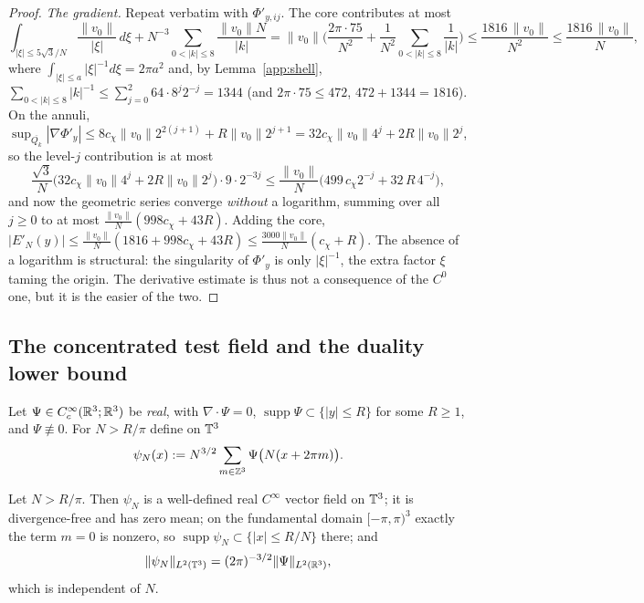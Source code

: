 \begin{proof}
\emph{The gradient.} Repeat verbatim with $\Phi'_{y,ij}$. The core
contributes at most
\[
\int_{|\xi|\le5\sqrt3/N}\frac{\|v_0\|}{|\xi|}\,d\xi
+N^{-3}\!\!\sum_{0<|k|\le8}\!\frac{\|v_0\|N}{|k|}
=\|v_0\|\Big(\frac{2\pi\cdot75}{N^{2}}
+\frac1{N^{2}}\!\!\sum_{0<|k|\le8}\!\frac1{|k|}\Big)
\le\frac{1816\,\|v_0\|}{N^{2}}\le\frac{1816\,\|v_0\|}{N},
\]
where $\int_{|\xi|\le a}|\xi|^{-1}d\xi=2\pi a^2$ and, by
Lemma~\ref{app:shell},
$\sum_{0<|k|\le8}|k|^{-1}\le\sum_{j=0}^{2}64\cdot8^{j}2^{-j}=1344$
(and $2\pi\cdot75\le472$, $472+1344=1816$). On the annuli,
$\sup_{\overline{Q_k}}|\nabla\Phi'_y|
\le8c_\chi\|v_0\|2^{2(j+1)}+R\|v_0\|2^{j+1}
=32c_\chi\|v_0\|4^{j}+2R\|v_0\|2^{j}$, so the level-$j$ contribution is
at most
\[
\frac{\sqrt3}{N}\big(32c_\chi\|v_0\|4^{j}+2R\|v_0\|2^{j}\big)
\cdot9\cdot2^{-3j}
\le\frac{\|v_0\|}{N}\big(499\,c_\chi2^{-j}+32\,R\,4^{-j}\big),
\]
and now the geometric series converge \emph{without} a logarithm,
summing over all $j\ge0$ to at most
$\frac{\|v_0\|}{N}(998c_\chi+43R)$. Adding the core,
$|E'_N(y)|\le\frac{\|v_0\|}{N}(1816+998c_\chi+43R)
\le\frac{3000\|v_0\|}{N}(c_\chi+R)$. The absence of a logarithm is
structural: the singularity of $\Phi'_y$ is only $|\xi|^{-1}$, the extra
factor $\xi$ taming the origin. The derivative estimate is thus not a
consequence of the $C^0$ one, but it is the easier of the two.
\end{proof}

\subsection{The concentrated test field and the duality lower bound}
\label{app:duality}

\begin{definition}\label{app:testfield}
Let $\Psi\in C_c^\infty(\mathbb R^3;\mathbb R^3)$ be \emph{real}, with
$\nabla\cdot\Psi=0$, $\operatorname{supp}\Psi\subset\{|y|\le R\}$ for
some $R\ge1$, and $\Psi\not\equiv0$. For $N>R/\pi$ define on $\mathbb T^3$
\[
\psi_N(x):=N^{3/2}\sum_{m\in\mathbb Z^3}\Psi\big(N(x+2\pi m)\big).
\]
\end{definition}

\begin{lemma}\label{app:psiprops}
Let $N>R/\pi$. Then $\psi_N$ is a well-defined real $C^\infty$ vector
field on $\mathbb T^3$; it is divergence-free and has zero mean; on the
fundamental domain $[-\pi,\pi)^3$ exactly the term $m=0$ is nonzero, so
$\operatorname{supp}\psi_N\subset\{|x|\le R/N\}$ there; and
\[
\|\psi_N\|_{L^2(\mathbb T^3)}=(2\pi)^{-3/2}\|\Psi\|_{L^2(\mathbb R^3)},
\]
which is independent of $N$.
\end{lemma}

